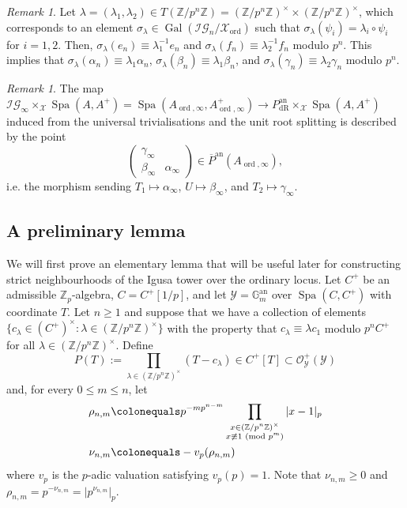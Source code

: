 \documentclass[10pt, oneside]{amsart}
\newcommand{\defeq}{\colonequals}
\DeclareMathOperator{\Gal}{Gal}
\numberwithin{equation}{subsection}
\theoremstyle{definition}
\theoremstyle{remark}
\newtheorem{remark}[equation]{Remark}
\newcommand{\mbb}[1]{\mathbb{#1}}
\newcommand{\opn}[1]{\operatorname{#1}}
\newcommand{\tbyt}[4]{\left( \begin{matrix} #1 & #2 \\ #3 & #4 \end{matrix} \right)}
\def\Z{{\mathbb{Z}}}
\begin{document}
\begin{remark}
Let $\lambda = (\lambda_1, \lambda_2) \in T(\mbb{Z}/p^n\mbb{Z}) = \left(\mbb{Z}/p^n\mbb{Z}\right)^{\times} \times \left(\mbb{Z}/p^n\mbb{Z}\right)^{\times}$, which corresponds to an element $\sigma_{\lambda} \in \Gal(\mathcal{IG}_n/\mathcal{X}_{\opn{ord}})$ such that $\sigma_{\lambda}(\psi_i) = \lambda_i \circ \psi_i$ for $i=1, 2$. Then, $\sigma_{\lambda}(e_n) \equiv \lambda_1^{-1} e_n$ and $\sigma_\lambda(f_n) \equiv \lambda_2^{-1} f_n$ modulo $p^n$. This implies that $\sigma_{\lambda}(\alpha_n) \equiv \lambda_1 \alpha_n$, $\sigma_{\lambda}(\beta_n) \equiv \lambda_1 \beta_n$, and $\sigma_{\lambda}(\gamma_n) \equiv \lambda_2 \gamma_n$ modulo $p^n$. 
\end{remark}

\begin{remark} \label{RemarkCongruencesalphan}
The map $\mathcal{IG}_\infty \times_{\mathcal{X}} \opn{Spa}(A, A^+) = \opn{Spa}(A_{\opn{ord}, \infty}, A_{\opn{ord}, \infty}^+) \to P_{\opn{dR}}^{\opn{an}} \times_{\mathcal{X}} \opn{Spa}(A, A^+)$ induced from the universal trivialisations and the unit root splitting is described by the point
\[
\tbyt{\gamma_{\infty}}{}{\beta_{\infty}}{\alpha_{\infty}} \in \overline{P}^{\opn{an}}(A_{\opn{ord}, \infty}), 
\]
i.e. the morphism sending $T_1 \mapsto \alpha_\infty$, $U \mapsto \beta_{\infty}$, and $T_2 \mapsto \gamma_{\infty}$.
\end{remark}

\subsection{A preliminary lemma}

We will first prove an elementary lemma that will be useful later for constructing strict neighbourhoods of the Igusa tower over the ordinary locus. Let $C^+$ be an admissible $\mbb{Z}_p$-algebra, $C = C^+[1/p]$, and let $\mathcal{Y} = \mbb{G}_m^{\opn{an}}$ over $\opn{Spa}(C, C^+)$ with coordinate $T$. Let $n \geq 1$ and suppose that we have a collection of elements
$\{ c_{\lambda} \in (C^+)^{\times} : \lambda \in \left(\mbb{Z}/p^n \mbb{Z} \right)^{\times} \}$ with the property that $c_{\lambda} \equiv \lambda c_{1}$ modulo $p^nC^+$ for all $\lambda \in \left(\mbb{Z}/p^n \mbb{Z}\right)^{\times}$. Define 
\[ P(T) := \prod_{\lambda \in (\Z / p^n \Z)^\times} (T - c_{\lambda}) \in C^+[T] \subset \mathcal{O}_{\mathcal{Y}}^+(\mathcal{Y}) \]
and, for every $0 \leq m \leq n$, let
\begin{align*} 
\rho_{n, m} & \defeq p^{-m p^{n - m}} \prod_{ \substack{x \in (\Z / p^n \Z)^\times \\ x \not \equiv 1 \text{ (mod $p^m$)}}} |x - 1|_p \\
\nu_{n, m} & \defeq - v_p(\rho_{n, m})
\end{align*}
where $v_p$ is the $p$-adic valuation satisfying $v_p(p) = 1$. Note that $\nu_{n, m} \geq 0$ and $\rho_{n, m} = p^{-\nu_{n, m}} = |p^{\nu_{n, m}}|_p$.
\end{document}
